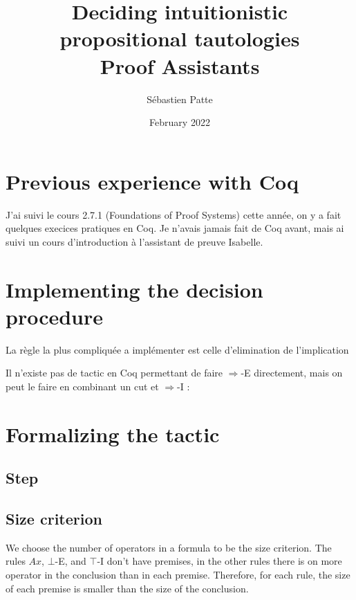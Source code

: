 \documentclass{article}
\title{Deciding intuitionistic propositional tautologies \\  Proof Assistants}
\author{Sébastien Patte}
\date{February 2022}
\begin{document}
\maketitle

\section{Previous experience with Coq}
J'ai suivi le cours 2.7.1 (Foundations of Proof Systems) cette année, on y a fait quelques execices pratiques en Coq. 
Je n'avais jamais fait de Coq avant, mais ai suivi un cours d'introduction à l'assistant de preuve Isabelle.

\section{Implementing the decision procedure}
La règle la plus compliquée a implémenter est celle d'elimination de l'implication

\begin{prooftree}
\end{prooftree}

\noindent Il n'existe pas de tactic en Coq permettant de faire $\Rightarrow$-E directement, mais on peut le faire en combinant un cut et $\Rightarrow$-I :

\begin{prooftree}
\end{prooftree}

\section{Formalizing the tactic}
\subsection{Step}

\subsection{Size criterion}
We choose the number of operators in a formula to be the size criterion.
The rules $Ax$, $\bot$-E, and $\top$-I don't have premises, in the other rules there is on more operator in the conclusion than in each premise.
Therefore, for each rule, the size of each premise is smaller than the size of the conclusion. 
\end{document}
